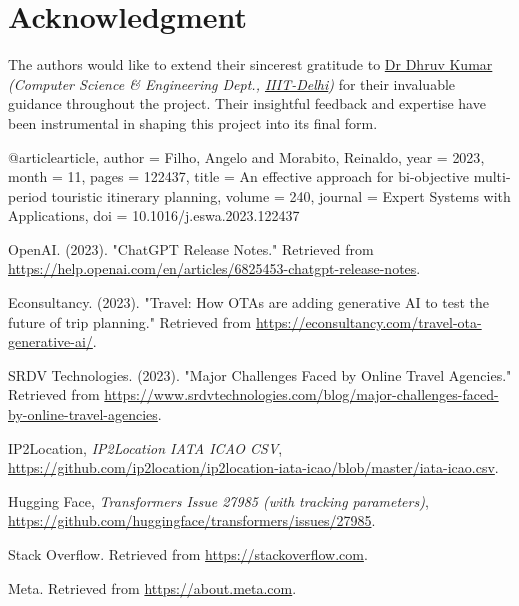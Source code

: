 \documentclass[conference]{IEEEtran}
\begin{document}
\section*{Acknowledgment}
    The authors would like to extend their sincerest gratitude to \href{https://www.iiitd.ac.in/dhruv}{Dr Dhruv Kumar} \textit{(Computer Science \& Engineering Dept., \href{https://www.iiitd.ac.in/}{IIIT-Delhi})} for their invaluable guidance throughout the project. Their insightful feedback and expertise have been instrumental in shaping this project into its final form.


\newpage

\begin{thebibliography}{1}

    @article{article,
    author = {Filho, Angelo and Morabito, Reinaldo},
    year = {2023},
    month = {11},
    pages = {122437},
    title = {An effective approach for bi-objective multi-period touristic itinerary planning},
    volume = {240},
    journal = {Expert Systems with Applications},
    doi = {10.1016/j.eswa.2023.122437}
    }

    OpenAI. (2023). "ChatGPT Release Notes." Retrieved from \url{https://help.openai.com/en/articles/6825453-chatgpt-release-notes}.

    Econsultancy. (2023). "Travel: How OTAs are adding generative AI to test the future of trip planning." Retrieved from \url{https://econsultancy.com/travel-ota-generative-ai/}.

    SRDV Technologies. (2023). "Major Challenges Faced by Online Travel Agencies." Retrieved from \url{https://www.srdvtechnologies.com/blog/major-challenges-faced-by-online-travel-agencies}.

    IP2Location, \emph{IP2Location IATA ICAO CSV}, \href{https://github.com/ip2location/ip2location-iata-icao/blob/master/iata-icao.csv}{https://github.com/ip2location/ip2location-iata-icao/blob/master/iata-icao.csv}.

    Hugging Face, \emph{Transformers Issue 27985 (with tracking parameters)}, \href{https://github.com/huggingface/transformers/issues/27985}{https://github.com/huggingface/transformers/issues/27985}.

    Stack Overflow. Retrieved from \url{https://stackoverflow.com}.

    Meta. Retrieved from \url{https://about.meta.com}.


\end{thebibliography}
\end{document}
